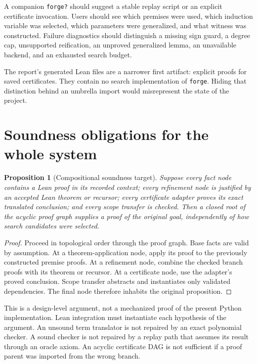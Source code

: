 \documentclass[11pt,a4paper]{article}
\newcommand{\forge}{\texttt{forge}}
\newcommand{\code}[1]{\texttt{\small #1}}
\newtheorem{proposition}{Proposition}[section]
\begin{document}
A companion \code{forge?} should suggest a stable replay script or an explicit
certificate invocation. Users should see which premises were used, which
induction variable was selected, which parameters were generalized, and what
witness was constructed. Failure diagnostics should distinguish a missing
sign guard, a degree cap, unsupported reification, an unproved generalized
lemma, an unavailable backend, and an exhausted search budget.

The report's generated Lean files are a narrower first artifact: explicit
proofs for saved certificates. They contain no search implementation of
\forge. Hiding that distinction behind an umbrella import would misrepresent
the state of the project.

\section{Soundness obligations for the whole system}

\begin{proposition}[Compositional soundness target]
Suppose every fact node contains a Lean proof in its recorded context; every
refinement node is justified by an accepted Lean theorem or recursor; every
certificate adapter proves its exact translated conclusion; and every scope
transfer is checked. Then a closed root of the acyclic proof graph supplies a
proof of the original goal, independently of how search candidates were
selected.
\end{proposition}
\begin{proof}
Proceed in topological order through the proof graph. Base facts are valid by
assumption. At a theorem-application node, apply its proof to the previously
constructed premise proofs. At a refinement node, combine the checked branch
proofs with its theorem or recursor. At a certificate node, use the adapter's
proved conclusion. Scope transfer abstracts and instantiates only validated
dependencies. The final node therefore inhabits the original proposition.
\end{proof}

This is a design-level argument, not a mechanized proof of the present Python
implementation. Lean integration must instantiate each hypothesis of the
argument. An unsound term translator is not repaired by an exact polynomial
checker. A sound checker is not repaired by a replay path that assumes its
result through an oracle axiom. An acyclic certificate DAG is not sufficient
if a proof parent was imported from the wrong branch.
\end{document}

